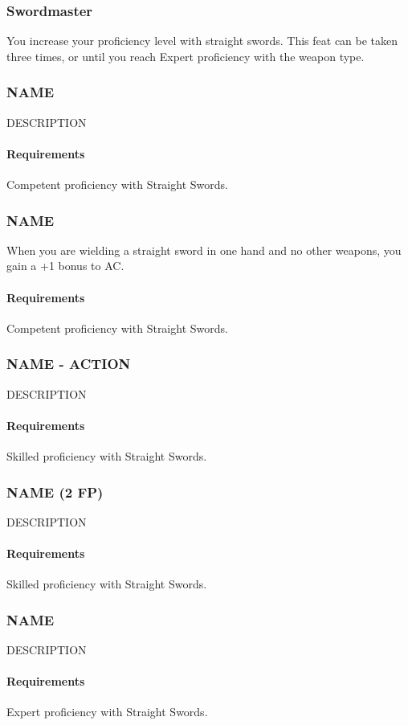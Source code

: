 \subsubsection{Swordmaster} \label{feat::swordmaster}
    You increase your proficiency level with straight swords.
    This feat can be taken three times, or until you reach Expert proficiency with the weapon type.
\subsubsection{NAME} \label{feat::name}
    DESCRIPTION
    \paragraph{Requirements} Competent proficiency with Straight Swords.
\subsubsection{NAME} \label{feat::name}
    When you are wielding a straight sword in one hand and no other weapons, you gain a +1 bonus to AC.
    \paragraph{Requirements} Competent proficiency with Straight Swords.
\subsubsection{NAME - ACTION} \label{feat::name}
    DESCRIPTION
    \paragraph{Requirements} Skilled proficiency with Straight Swords.
\subsubsection{NAME (2 FP)} \label{feat::name}
    DESCRIPTION
    \paragraph{Requirements} Skilled proficiency with Straight Swords.
\subsubsection{NAME} \label{feat::name}
    DESCRIPTION
    \paragraph{Requirements} Expert proficiency with Straight Swords.
